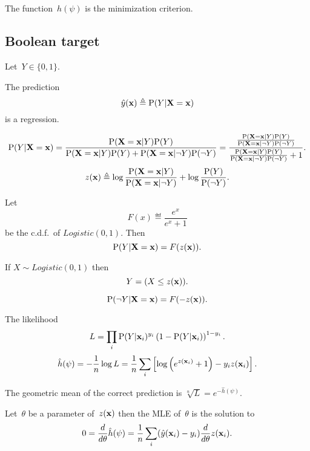\documentclass[10pt,a4paper]{article}
\theoremstyle{plain} \newtheorem{Lem}{Lemma}
\begin{document}
The function~$\hat h(\psi)$ is the minimization criterion.


\subsection{Boolean target}

Let~$Y \in \{0,1\}$.

The prediction
$$ \hat y(\mathbf x) \triangleq \mathrm P(Y|\mathbf X = \mathbf x) $$
is a regression.

\begin{equation*}
\begin{split}
\mathrm P(Y|\mathbf X = \mathbf x)
  = \frac {\mathrm P(\mathbf X = \mathbf x|Y) \mathrm P(Y)} {\mathrm P(\mathbf X = \mathbf x|Y) \mathrm P(Y) + \mathrm P(\mathbf X = \mathbf x|\neg Y) \mathrm P(\neg Y)}
  = \frac {\frac {\mathrm P(\mathbf X = \mathbf x|Y) \mathrm P(Y)}
                  {\mathrm P(\mathbf X = \mathbf x|\neg Y) \mathrm P(\neg Y)}
           }
           {\frac {\mathrm P(\mathbf X = \mathbf x|Y) \mathrm P(Y)}
                  {\mathrm P(\mathbf X = \mathbf x|\neg Y) \mathrm P(\neg Y)}
            + 1
           }.
\end{split}
\end{equation*}
$$ z(\mathbf x) \triangleq   \log \frac {\mathrm P(\mathbf X = \mathbf x|Y)}
                                {\mathrm P(\mathbf X = \mathbf x|\neg Y)}
                   + \log \frac {\mathrm P(Y)} {\mathrm P(\neg Y)}.
$$

Let
$$ F(x) \eqdef \frac {e^x} {e^x + 1} $$
be the c.d.f.~of $Logistic(0,1)$.
Then
$$ \mathrm P(Y|\mathbf X = \mathbf x) = F(z(\mathbf x)). $$

If $X \sim Logistic(0,1)$ then
$$ Y = (X \le z(\mathbf x)).$$

$$ \mathrm P(\neg Y|\mathbf X = \mathbf x) = F(- z(\mathbf x)). $$

The likelihood
$$ L = \prod_i \mathrm P(Y|\mathbf x_i)^{y_i} \left(1 - \mathrm P(Y|\mathbf x_i) \right)^{1-y_i}. $$
$$ \hat h (\psi) = - \frac 1 n \log L = \frac 1 n \sum_i \left[ \log \left(e^{z(\mathbf x_i)} + 1\right) - y_i z(\mathbf x_i) \right]. $$

The geometric mean of the correct prediction is $\sqrt[n]L = e^{- \hat h(\psi)}$.

Let~$\theta$ be a parameter of~$z(\mathbf x)$ then the MLE of~$\theta$ is the solution to
\begin{equation}\label{boolPredictMLE}
0 = \frac d {d \theta} \hat h (\psi) = \frac 1 n \sum_i (\hat y(\mathbf x_i) - y_i) \frac d {d \theta} z(\mathbf x_i).
\end{equation}

\end{document}

